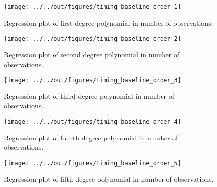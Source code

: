\documentclass[11pt, a4paper, leqno]{article}
\begin{document}
\begin{figure}[H]
    \caption{Regression plot of first degree polynomial in number of observations.}
    
    \texttt{[image: ../../out/figures/timing\_baseline\_order\_1]}

\end{figure}


\begin{figure}[H]
    \caption{Regression plot of second degree polynomial in number of observations.}
    
    \texttt{[image: ../../out/figures/timing\_baseline\_order\_2]}
\end{figure}


\begin{figure}[H]
    \caption{Regression plot of third degree polynomial in number of observations.}
    
    \texttt{[image: ../../out/figures/timing\_baseline\_order\_3]}

\end{figure}


\begin{figure}[H]
    \caption{Regression plot of fourth degree polynomial in number of observations.}
    
    \texttt{[image: ../../out/figures/timing\_baseline\_order\_4]}

\end{figure}


\begin{figure}[H]
    \caption{Regression plot of fifth degree polynomial in number of observations.}
    
    \texttt{[image: ../../out/figures/timing\_baseline\_order\_5]}

\end{figure}

\clearpage







\end{document}
